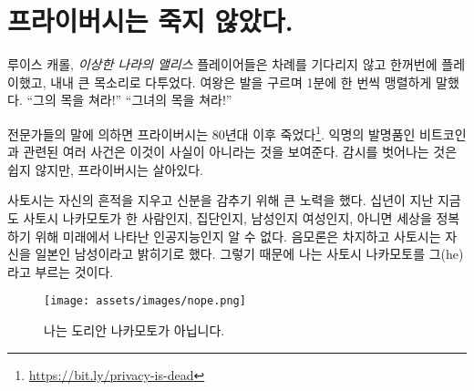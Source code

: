 \chapter{프라이버시는 죽지 않았다.}
\label{les:19}

\begin{chapquote}
{루이스 캐롤, \textit{이상한 나라의 앨리스}}
플레이어들은 차례를 기다리지 않고 한꺼번에 플레이했고,
내내 큰 목소리로 다투었다.
여왕은 발을 구르며 1분에 한 번씩 맹렬하게 말했다.
 \enquote{그의 목을 쳐라!}
 \enquote{그녀의 목을 쳐라!}
\end{chapquote}

\begin{comment}
If pundits are to believed, privacy has been dead since the
80ies\footnote{\url{https://bit.ly/privacy-is-dead}}. The pseudonymous invention
of Bitcoin and other events in recent history show that this is not the case.
Privacy is alive, even though it is by no means easy to escape the surveillance
state.
\end{comment}
전문가들의 말에 의하면 프라이버시는 80년대 이후 죽었다\footnote{\url{https://bit.ly/privacy-is-dead}}.
익명의 발명품인 비트코인과 관련된 여러 사건은 이것이 사실이 아니라는 것을 보여준다.
감시를 벗어나는 것은 쉽지 않지만, 프라이버시는 살아있다.

\begin{comment}
Satoshi went through great lengths to cover up his tracks and conceal
his identity. Ten years later, it is still unknown if Satoshi Nakamoto
was a single person, a group of people, male, female, or a
time-traveling AI which bootstrapped itself to take over the world.
Conspiracy theories aside, Satoshi chose to identify himself to be a
Japanese male, which is why I don't assume but respect his chosen gender
and refer to him as \textit{he}.
\end{comment}
사토시는 자신의 흔적을 지우고 신분을 감추기 위해 큰 노력을 했다.
십년이 지난 지금도 사토시 나카모토가 한 사람인지, 
집단인지, 남성인지 여성인지, 아니면 세상을 정복하기 위해 미래에서 나타난 인공지능인지 알 수 없다.
음모론은 차지하고 사토시는 자신을 일본인 남성이라고 밝히기로 했다. 
그렇기 때문에 나는 사토시 나카모토를 그(he)라고 부르는 것이다.
\begin{figure}
  \texttt{[image: assets/images/nope.png]}
  \caption{나는 도리안 나카모토가 아닙니다.}
  \label{fig:nope}
\end{figure}

